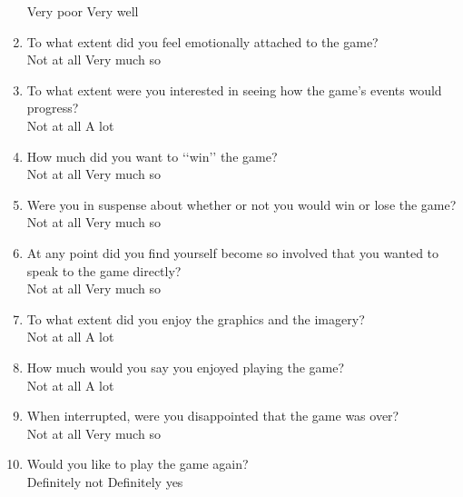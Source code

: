 \documentclass[../II2202-proposal.tex]{subfiles}
\begin{document}
\begin{enumerate}
    Very poor      \quad Very well
    \item To what extent did you feel emotionally attached to the game? \\
    Not at all      \quad Very much so
    \item To what extent were you interested in seeing how the game’s events would progress? \\
    Not at all      \quad A lot
    \item How much did you want to ‘‘win’’ the game? \\
    Not at all      \quad Very much so
    \item Were you in suspense about whether or not you would win or lose the game? \\
    Not at all      \quad Very much so
    \item At any point did you find yourself become so involved that you wanted to speak to the game directly? \\
    Not at all      \quad Very much so
    \item To what extent did you enjoy the graphics and the imagery?  \\
    Not at all      \quad A lot
    \item How much would you say you enjoyed playing the game?  \\
    Not at all      \quad A lot
    \item When interrupted, were you disappointed that the game was over? \\
    Not at all      \quad Very much so
    \item Would you like to play the game again? \\
    Definitely not      \quad Definitely yes
\end{enumerate}
\end{document}

